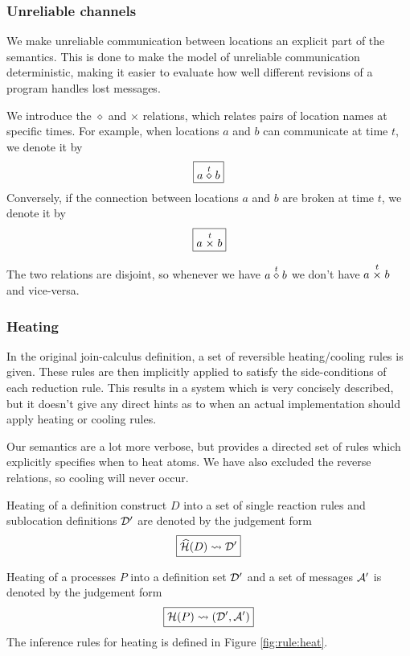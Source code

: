 \subsubsection{Unreliable channels}
We make unreliable communication between locations an explicit part of the
semantics. This is done to make the model of unreliable communication
deterministic, making it easier to evaluate how well different revisions of a
program handles lost messages.

We introduce the $\diamond$ and $\times$ relations, which relates pairs of
location names at specific times. For example, when locations $a$ and $b$ can
communicate at time $t$, we denote it by
\begin{equation*}
 \boxed{a \stackrel{t}{\diamond} b}
\end{equation*}
Conversely, if the connection between locations $a$ and $b$ are broken at time
$t$, we denote it by
\begin{equation*}
 \boxed{a \stackrel{t}{\times} b}
\end{equation*}

The two relations are disjoint, so whenever we have $a \stackrel{t}{\diamond} b$ we don't
have $a \stackrel{t}{\times} b$ and vice-versa.

\subsubsection{Heating}
In the original join-calculus definition, a set of reversible heating/cooling
rules is given. These rules are then implicitly applied to satisfy the
side-conditions of each reduction rule. This results in a system which is very
concisely described, but it doesn't give any direct hints as to when an actual
implementation should apply heating or cooling rules.

Our semantics are a lot more verbose, but provides a directed set of rules
which explicitly specifies when to heat atoms. We have also excluded the
reverse relations, so cooling will never occur.

Heating of a definition construct $D$ into a set of single reaction rules and
sublocation definitions $\mathcal{D}'$ are denoted by the judgement form
\begin{equation*}
  \boxed{\widehat{\mathcal{H}}(D) \leadsto \mathcal{D}'}
\end{equation*}

Heating of a processes $P$ into a definition set $\mathcal{D}'$ and a set of messages
$\mathcal{A}'$ is denoted by the judgement form
\begin{equation*}
  \boxed{\mathcal{H}(P) \leadsto (\mathcal{D}', \mathcal{A}')}
\end{equation*}
The inference rules for heating is defined in Figure \ref{fig:rule:heat}.

